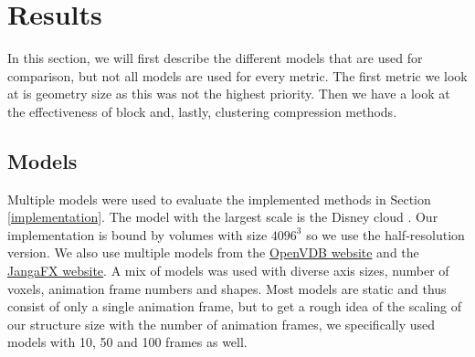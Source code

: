 \section{Results} \label{results}
In this section, we will first describe the different models that are used for comparison, but not all models are used for every metric. The first metric we look at is geometry size as this was not the highest priority. Then we have a look at the effectiveness of block and, lastly, clustering compression methods.


\subsection{Models} \label{results:models}
Multiple models were used to evaluate the implemented methods in Section \ref{implementation}. The model with the largest scale is the Disney cloud \cite{DisneyCloud}. Our implementation is bound by volumes with size $4096^3$ so we use the half-resolution version. We also use multiple models from the \href{https://www.openvdb.org/download/}{OpenVDB website} and the \href{https://jangafx.com/software/embergen/download/free-vdb-animations/}{JangaFX website}. A mix of models was used with diverse axis sizes, number of voxels, animation frame numbers and shapes. Most models are static and thus consist of only a single animation frame, but to get a rough idea of the scaling of our structure size with the number of animation frames, we specifically used models with 10, 50 and 100 frames as well.

